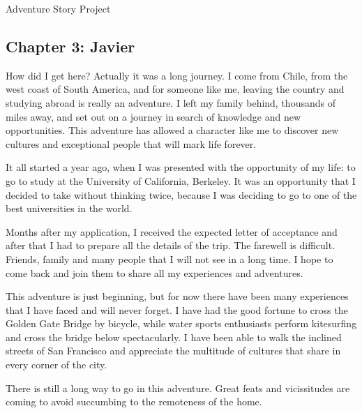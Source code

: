 \documentclass{article}
\begin{document}
\Huge Adventure Story Project

\normalsize

\subsection*{Chapter 3: Javier}

How did I get here? Actually it was a long journey. I come from Chile, from the west coast of South America, and for someone like me, leaving the country and studying abroad is really an adventure. I left my family behind, thousands of miles away, and set out on a journey in search of knowledge and new opportunities. This adventure has allowed a character like me to discover new cultures and exceptional people that will mark life forever.

It all started a year ago, when I was presented with the opportunity of my life: to go to study at the University of California, Berkeley. It was an opportunity that I decided to take without thinking twice, because I was deciding to go to one of the best universities in the world.

Months after my application, I received the expected letter of acceptance and after that I had to prepare all the details of the trip. The farewell is difficult. Friends, family and many people that I will not see in a long time. I hope to come back and join them to share all my experiences and adventures.

This adventure is just beginning, but for now there have been many experiences that I have faced and will never forget. I have had the good fortune to cross the Golden Gate Bridge by bicycle, while water sports enthusiasts perform kitesurfing and cross the bridge below spectacularly. I have been able to walk the inclined streets of San Francisco and appreciate the multitude of cultures that share in every corner of the city.

There is still a long way to go in this adventure. Great feats and vicissitudes are coming to avoid succumbing to the remoteness of the home.
\end{document}
